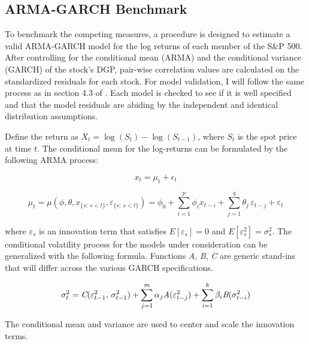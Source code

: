 \documentclass[12pt]{article}
\begin{document}
\subsection{ARMA-GARCH Benchmark} \label{sec:ARMAGARCH-benchmark}

To benchmark the competing measures, a procedure is designed to estimate a valid ARMA-GARCH model for the log returns of each member of the S\&P 500. After controlling for the conditional mean (ARMA) and the conditional variance (GARCH) of the stock's DGP, pair-wise correlation values are calculated on the standardized residuals for each stock. For model validation, I will follow the same process as in section 4.3 of \cite{DowiakTV-COP}. Each model is checked to see if it is well specified and that the model residuals are abiding by the independent and identical distribution assumptions.

Define the return as $X_{t} = \log \left(S_{t}\right) - \log\left(S_{t-1}\right)$, where $S_{t}$ is the spot price at time $t$. The conditional mean for the log-returns can be formulated by the following ARMA process:

\begin{equation} \label{eqn:marginalModel}
    x_{t} = \mu_{t} + \epsilon_{t}
\end{equation}

\begin{equation}
    \mu_{t} = \mu(\phi, \theta, x_{\{s:\, s < t\}}, \varepsilon_{\{s:\, s < t\}}) = \phi_{0} + \sum_{i=1}^{p} \phi_{i} x_{t-i} + \sum_{j=1}^{q} \theta_{j} \, \varepsilon_{t - j} + \varepsilon_{t}
\end{equation}

where $\varepsilon_{s}$ is an innovation term that satisfies $E[\varepsilon_{s}] = 0$ and $E[\varepsilon^{2}_{s}] = \sigma^{2}_{s}$. The conditional volatility process for the models under consideration can be generalized with the following formula. Functions \emph{A}, \emph{B}, \emph{C} are generic stand-ins that will differ across the various GARCH specifications.

\begin{equation}
    \sigma^{2}_{t} = \emph{C}(\varepsilon^{2}_{t-1}, \, \sigma^{2}_{t-1}) + \sum_{j=1}^{m} \alpha_{j} \emph{A}(\varepsilon^{2}_{t - j}) + \sum_{i=1}^{k} \beta_{i} \emph{B}(\sigma^{2}_{t - i})
\end{equation}

The conditional mean and variance are used to center and scale the innovation terms.
\end{document}
